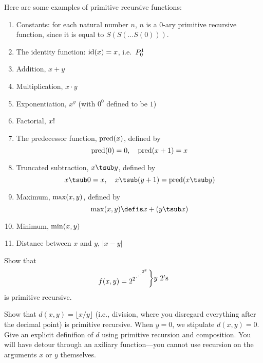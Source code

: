 \documentclass[../../include/open-logic-section]{subfiles}
\begin{document}


Here are some examples of primitive recursive functions:
\begin{enumerate}
\item Constants: for each natural number $n$, $n$ is a 0-ary primitive
  recursive function, since it is equal to $S(S(\dots S(0)))$.

\item The identity function: $\mathrm{id}(x) = x$, i.e.\ $P^{1}_{0}$

\item Addition, $x+y$

\item Multiplication, $x \cdot y$

\item Exponentiation, $x^y$ (with $0^0$ defined to be $1$)

\item Factorial, $x\text{!}$

\item The predecessor function, $\mathrm{pred}(x)$, defined by
\[
\mathrm{pred}(0) = 0, \quad \mathrm{pred}(x+1) = x
\]

\item Truncated subtraction, $x \tsub y$, defined by 
\[
x \tsub 0 = x, \quad x \tsub (y+1) = \fn{pred}(x \tsub y)
\]

\item Maximum, $\mathrm{max}(x,y)$, defined by 
\[
\fn{max}(x,y) \defis x + (y \tsub x)
\]

\item Minimum, $\mathrm{min}(x,y)$

\item Distance between $x$ and $y$, $\left|x-y\right|$
\end{enumerate}

\begin{prob}
Show that \[f(x, y) =
2^{2^{\iddots^{2^{x}}}}\raisebox{1ex}{\bigg\rbrace}
\raisebox{1ex}{\text {$y$ $2$'s}}\] is primitive recursive.
\end{prob}

\begin{prob}
Show that $d(x, y) = \lfloor x/y \rfloor$ (i.e., division, where you
disregard everything after the decimal point) is primitive
recursive. When $y = 0$, we stipulate $d(x, y) = 0$.  Give an explicit
definifion of $d$ using primitive recursion and composition. You will
have detour through an axiliary function---you cannot use recursion on
the arguments $x$ or $y$ themselves.
\end{prob}
\end{document}
